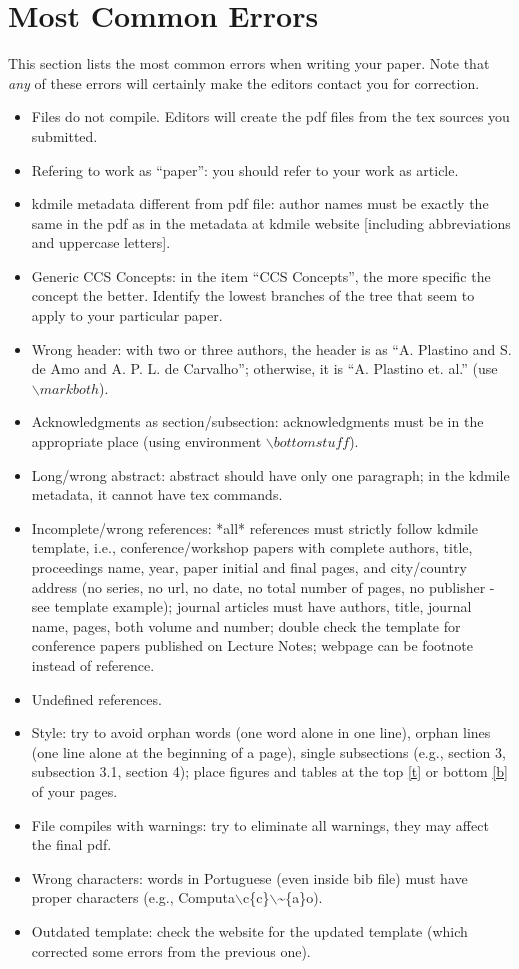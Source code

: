\documentclass[kdmile,a4paper]{kdmile} %
\begin{document}
\section{Most Common Errors}

This section lists the most common errors when writing your paper. Note that \textit{any} of these errors will certainly make the editors contact you for correction.

\begin{itemize}
	\item Files do not compile. Editors will create the pdf files from the tex sources you submitted.
	\item Refering to work as ``paper'': you should refer to your work as article.
	\item kdmile metadata different from pdf file: author names must be exactly the same in the pdf as in the metadata at kdmile website [including abbreviations and uppercase letters].
	\item Generic CCS Concepts: in the item ``CCS Concepts'', the more specific the concept the better. Identify the lowest branches of the tree that seem to apply to your particular paper.	
	\item Wrong header: with two or three authors, the header is as ``A. Plastino and S. de Amo and A. P. L. de Carvalho''; otherwise, it is ``A. Plastino et. al.'' (use $\backslash markboth$).
	\item Acknowledgments as section/subsection: acknowledgments must be in the appropriate place (using environment $\backslash bottomstuff$).
	\item Long/wrong abstract: abstract should have only one paragraph; in the kdmile metadata, it cannot have tex commands.
	\item Incomplete/wrong references: *all* references must strictly follow kdmile template, i.e., conference/workshop papers with complete authors, title, proceedings name, year, paper initial and final pages, and city/country address (no series, no url, no date, no total number of pages, no publisher - see template example); journal articles must have authors, title, journal name, pages, both volume and number; double check the template for conference papers published on Lecture Notes; webpage can be footnote instead of reference.
	\item Undefined references.
	\item Style: try to avoid orphan words (one word alone in one line), orphan lines (one line alone at the beginning of a page), single subsections (e.g., section 3, subsection 3.1, section 4); place figures and tables at the top \url{[t]} or bottom \url{[b]} of your pages.
	\item File compiles with warnings: try to eliminate all warnings, they may affect the final pdf.
	\item Wrong characters: words in Portuguese (even inside bib file) must have proper characters (e.g., Computa$\backslash$c\{c\}$\backslash$\textasciitilde\{a\}o).
	\item Outdated template: check the website for the updated template (which corrected some errors from the previous one).
\end{itemize}
	
\end{document}
